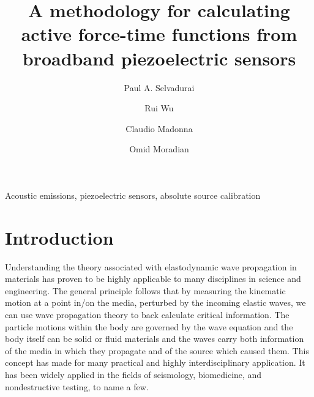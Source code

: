 \documentclass[preprint,3p, 11pt,authoryear]{elsarticle}
\begin{document}
\begin{frontmatter}



\title{A methodology for calculating active force-time functions from broadband piezoelectric sensors}

 \author[1]{Paul A. Selvadurai }
\author[2]{Rui Wu}
\author[3]{Claudio Madonna}
\author[2]{Omid Moradian}




\address[1]{Swiss Seismological Service, ETH Zurich, Zurich, Switzerland}
\address[2]{Engineering Geology Group, ETH Zurich, Zurich, Switzerland}
\address[3]{Department of Earth Sciences, ETH Zurich, Zurich, Switzerland}



\begin{abstract}

\end{abstract}

\begin{keyword}
Acoustic emissions,  piezoelectric sensors, absolute source calibration 
\end{keyword}
\end{frontmatter}

\doublespacing
\linenumbers
\clearpage
\section{Introduction}
\label{int}

Understanding the theory associated with elastodynamic wave propagation in materials has proven to be highly applicable to many disciplines in science and engineering. The general principle follows that by measuring the kinematic motion at a point in/on the media, perturbed by the incoming elastic waves, we can use wave propagation theory to back calculate critical information. The particle motions within the body are governed by the wave equation and the body itself can be solid or fluid materials and the waves carry both information of the media in which they propagate and of the source which caused them. This concept has made for many practical and highly interdisciplinary application. It has been widely applied in the fields of seismology, biomedicine, and nondestructive testing, to name a few.
\end{document}
